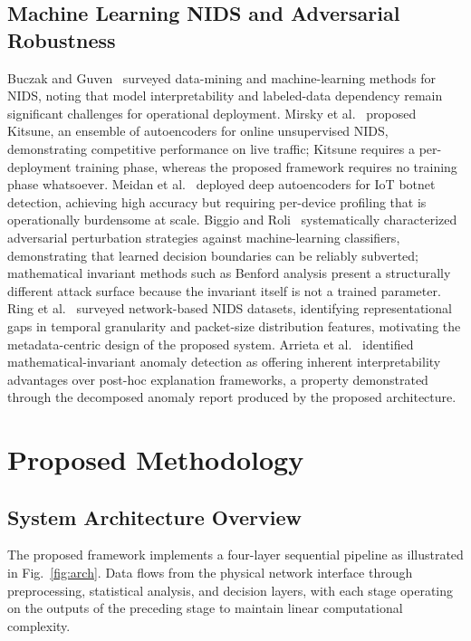 \documentclass[conference]{IEEEtran}
\begin{document}
\subsection{Machine Learning NIDS and Adversarial Robustness}

Buczak and Guven~\cite{b16} surveyed data-mining and machine-learning
methods for NIDS, noting that model interpretability and labeled-data
dependency remain significant challenges for operational deployment.
Mirsky et al.~\cite{b14} proposed Kitsune, an ensemble of autoencoders for
online unsupervised NIDS, demonstrating competitive performance on live
traffic; Kitsune requires a per-deployment training phase, whereas the
proposed framework requires no training phase whatsoever.
Meidan et al.~\cite{b15} deployed deep autoencoders for IoT botnet
detection, achieving high accuracy but requiring per-device profiling that
is operationally burdensome at scale.
Biggio and Roli~\cite{b3} systematically characterized adversarial
perturbation strategies against machine-learning classifiers, demonstrating
that learned decision boundaries can be reliably subverted; mathematical
invariant methods such as Benford analysis present a structurally different
attack surface because the invariant itself is not a trained parameter.
Ring et al.~\cite{b17} surveyed network-based NIDS datasets, identifying
representational gaps in temporal granularity and packet-size distribution
features, motivating the metadata-centric design of the proposed system.
Arrieta et al.~\cite{b18} identified mathematical-invariant anomaly
detection as offering inherent interpretability advantages over post-hoc
explanation frameworks, a property demonstrated through the decomposed
anomaly report produced by the proposed architecture.

\section{Proposed Methodology}

\subsection{System Architecture Overview}

The proposed framework implements a four-layer sequential pipeline as
illustrated in Fig.~\ref{fig:arch}. Data flows from the physical network
interface through preprocessing, statistical analysis, and decision layers,
with each stage operating on the outputs of the preceding stage to maintain
linear computational complexity.
\end{document}
